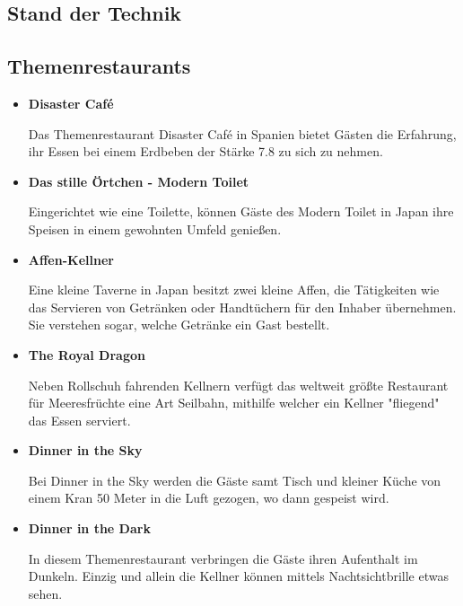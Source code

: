   \subsection{Stand der Technik}
  \subsection*{Themenrestaurants}
  \begin{itemize}
    \item \textbf{Disaster Café}

    Das Themenrestaurant {Disaster Café\cite{disastercafe}} in Spanien bietet Gästen die Erfahrung, ihr Essen bei einem Erdbeben
    der Stärke 7.8 zu sich zu nehmen.

    \item \textbf{Das stille Örtchen - Modern Toilet}

    Eingerichtet wie eine Toilette, können Gäste des {Modern Toilet\cite{moderntoilet}} in Japan ihre Speisen in einem gewohnten Umfeld genießen.

    \item \textbf{Affen-Kellner}

    {Eine kleine Taverne in Japan\cite{affenkellner}} besitzt zwei kleine Affen, die Tätigkeiten wie das Servieren von Getränken oder Handtüchern
    für den Inhaber übernehmen. Sie verstehen sogar, welche Getränke ein Gast bestellt.

    \item \textbf{The Royal Dragon}

    Neben Rollschuh fahrenden Kellnern verfügt das weltweit größte {Restaurant für Meeresfrüchte\cite{royaldragon}} eine
    Art Seilbahn, mithilfe welcher ein Kellner "fliegend" das Essen serviert.

    \item \textbf{Dinner in the Sky}

    Bei {Dinner in the Sky\cite{dinnerinthesky}} werden die Gäste samt Tisch und kleiner Küche von einem Kran 50 Meter
    in die Luft gezogen, wo dann gespeist wird.

    \item \textbf{Dinner in the Dark}

    In diesem {Themenrestaurant\cite{dinnerinthedark}} verbringen die Gäste ihren Aufenthalt im Dunkeln. Einzig und allein die
    Kellner können mittels Nachtsichtbrille etwas sehen.
  \end{itemize}

